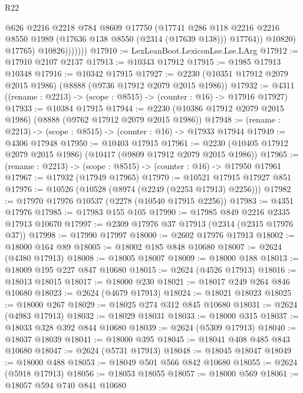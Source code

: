 \begin{lexlean}{R22}
\begin{coremodule}
                        @626
                        @2216
                        @2218
                        @784
                        @8609
                        @17750
                        (@17741
                          @286
                          @118
                          @2216
                          @2216
                          @8550
                          @1989
                          (@17636 @138 @8550 (@2314 (@17639 @138)))
                          @17764))
                      @10820)
                    @17765)
                  @10826)))))))
@17910 := LexLeanBoot.LexiconLse.Lse.LArg
@17912 := @17910 @2107 @2137
@17913 := @10343 @17912
@17915 := @1985 @17913 @10348
@17916 := @10342 @17915
@17927 := @2230 (@10351 @17912 @2079 @2015 @1986) (@8888 (@9736 @17912 @2079 @2015 @1986))
@17932 := @4311 ((rename : @2213) -> (scope : @8515) -> (counter : @16) -> @17916 @17927)
@17933 := @10384 @17915
@17944 := @2230 (@10386 @17912 @2079 @2015 @1986) (@8888 (@9762 @17912 @2079 @2015 @1986))
@17948 := (rename : @2213) -> (scope : @8515) -> (counter : @16) -> @17933 @17944
@17949 := @4306 @17948
@17950 := @10403 @17915
@17961 := @2230 (@10405 @17912 @2079 @2015 @1986) (@10417 (@9809 @17912 @2079 @2015 @1986))
@17965 := (rename : @2213) -> (scope : @8515) -> (counter : @16) -> @17950 @17961
@17967 := @17932 (@17949 @17965)
@17970 := @10521 @17915 @17927 @851
@17976 := @10526 (@10528 (@8974 (@2249 (@2253 @17913) @2256)))
@17982 := @17970 @17976 @10537 (@2278 (@10540 @17915 @2256))
@17983 := @4351 @17976
@17985 := @17983 @155 @105
@17990 := @17985 @849 @2216 @2335 @17913 @10670
@17997 := @2309 @17976 @37 @17913 (@2314 (@2315 @17976 @37))
@17998 := @17990 @17997
@18000 := @2602 @17976 @17913
@18002 := @18000 @164 @89
@18005 := @18002 @185 @848 @10680
@18007 := @2624 (@4380 @17913)
@18008 := @18005 @18007
@18009 := @18000 @188
@18013 := @18009 @195 @227 @847 @10680
@18015 := @2624 (@4526 @17913)
@18016 := @18013 @18015
@18017 := @18000 @230
@18021 := @18017 @249 @264 @846 @10680
@18023 := @2624 (@4679 @17913)
@18024 := @18021 @18023
@18025 := @18000 @267
@18029 := @18025 @274 @312 @845 @10680
@18031 := @2624 (@4983 @17913)
@18032 := @18029 @18031
@18033 := @18000 @315
@18037 := @18033 @328 @392 @844 @10680
@18039 := @2624 (@5309 @17913)
@18040 := @18037 @18039
@18041 := @18000 @395
@18045 := @18041 @408 @485 @843 @10680
@18047 := @2624 (@5731 @17913)
@18048 := @18045 @18047
@18049 := @18000 @488
@18053 := @18049 @501 @566 @842 @10680
@18055 := @2624 (@5918 @17913)
@18056 := @18053 @18055
@18057 := @18000 @569
@18061 := @18057 @594 @740 @841 @10680

\end{coremodule}
\end{lexlean}

